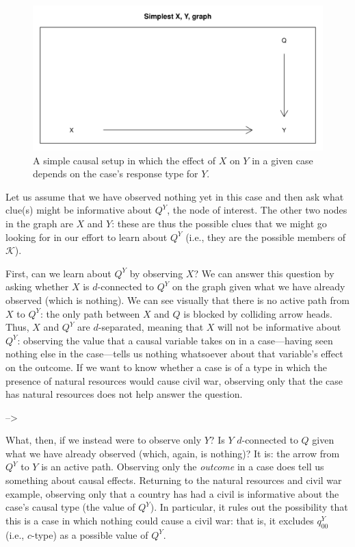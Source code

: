 \documentclass[
  12pt,
]{book}
\begin{document}
\begin{figure}

{\centering \includegraphics[width=.5\textwidth]{ii_files/figure-latex/sepsimple-1} 

}

\caption{\label{fig:d-sepsimple} A simple causal setup in which the effect of $X$ on $Y$ in a given case depends on the case's response type for $Y$.}\label{fig:sepsimple}
\end{figure}

Let us assume that we have observed nothing yet in this case and then ask what clue(s) might be informative about \(Q^Y\), the node of interest. The other two nodes in the graph are \(X\) and \(Y\): these are thus the possible clues that we might go looking for in our effort to learn about \(Q^Y\) (i.e., they are the possible members of \(\mathcal K\)).

First, can we learn about \(Q^Y\) by observing \(X\)? We can answer this question by asking whether \(X\) is \(d\)-connected to \(Q^Y\) on the graph given what we have already observed (which is nothing). We can see visually that there is no active path from \(X\) to \(Q^Y\): the only path between \(X\) and \(Q\) is blocked by colliding arrow heads. Thus, \(X\) and \(Q^Y\) are \(d\)-separated, meaning that \(X\) will not be informative about \(Q^Y\): observing the value that a causal variable takes on in a case---having seen nothing else in the case---tells us nothing whatsoever about that variable's effect on the outcome. If we want to know whether a case is of a type in which the presence of natural resources would cause civil war, observing only that the case has natural resources does not help answer the question.

--\textgreater{}

What, then, if we instead were to observe only \(Y\)? Is \(Y\) \(d\)-connected to \(Q\) given what we have already observed (which, again, is nothing)? It is: the arrow from \(Q^Y\) to \(Y\) is an active path. Observing only the \emph{outcome} in a case does tell us something about causal effects. Returning to the natural resources and civil war example, observing only that a country has had a civil is informative about the case's causal type (the value of \(Q^Y\)). In particular, it rules out the possibility that this is a case in which nothing could cause a civil war: that is, it excludes \(q^Y_{00}\) (i.e., \(c\)-type) as a possible value of \(Q^Y\).
\end{document}
